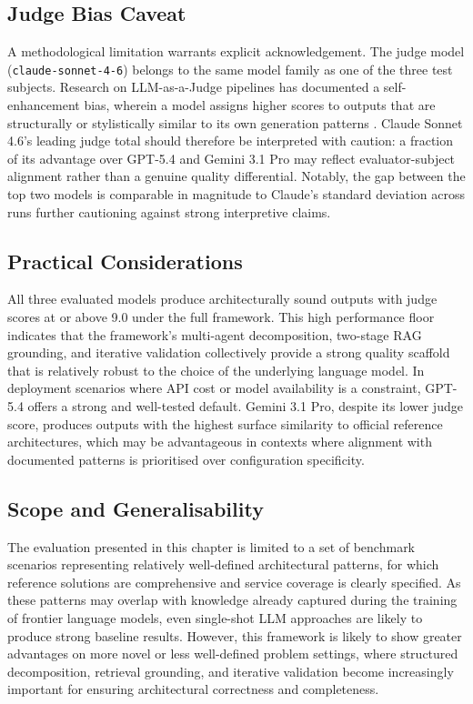 \subsection{Judge Bias Caveat}
\label{subsec:judge_bias}

A methodological limitation warrants explicit acknowledgement. The judge model (\texttt{claude-sonnet-4-6}) belongs to the same model family as one of the three test subjects. Research on LLM-as-a-Judge pipelines has documented a self-enhancement bias, wherein a model assigns higher scores to outputs that are structurally or stylistically similar to its own generation patterns \cite{zheng2024judging}. Claude Sonnet 4.6's leading judge total should therefore be interpreted with caution: a fraction of its advantage over GPT-5.4 and Gemini 3.1 Pro may reflect evaluator-subject alignment rather than a genuine quality differential. Notably, the gap between the top two models is comparable in magnitude to Claude's standard deviation across runs further cautioning against strong interpretive claims. 

\subsection{Practical Considerations}

All three evaluated models produce architecturally sound outputs with judge scores at or above 9.0 under the full framework. This high performance floor indicates that the framework's multi-agent decomposition, two-stage RAG grounding, and iterative validation collectively provide a strong quality scaffold that is relatively robust to the choice of the underlying language model. In deployment scenarios where API cost or model availability is a constraint, GPT-5.4 offers a strong and well-tested default. Gemini 3.1 Pro, despite its lower judge score, produces outputs with the highest surface similarity to official reference architectures, which may be advantageous in contexts where alignment with documented patterns is prioritised over configuration specificity.

\subsection{Scope and Generalisability}

The evaluation presented in this chapter is limited to a set of benchmark scenarios representing relatively well-defined architectural patterns, for which reference solutions are comprehensive and service coverage is clearly specified. As these patterns may overlap with knowledge already captured during the training of frontier language models, even single-shot LLM approaches are likely to produce strong baseline results. However, this framework is likely to show greater advantages on more novel or less well-defined problem settings, where structured decomposition, retrieval grounding, and iterative validation become increasingly important for ensuring architectural correctness and completeness.

